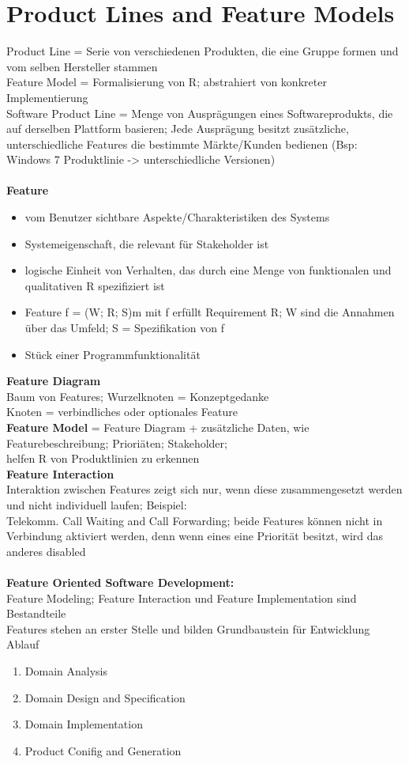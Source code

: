 \section{Product Lines and Feature Models}
Product Line = Serie von verschiedenen Produkten, die eine Gruppe formen und vom selben Hersteller stammen\\
Feature Model = Formalisierung von R; abstrahiert von konkreter Implementierung\\
Software Product Line = Menge von Ausprägungen eines Softwareprodukts, die auf derselben Plattform basieren; Jede Ausprägung besitzt zusätzliche, unterschiedliche Features die bestimmte Märkte/Kunden bedienen (Bsp: Windows 7 Produktlinie -> unterschiedliche Versionen)\\
\\
\textbf{Feature}\\
\begin{itemize}
	\item vom Benutzer sichtbare Aspekte/Charakteristiken des Systems
	\item Systemeigenschaft, die relevant für Stakeholder ist
	\item logische Einheit von Verhalten, das durch eine Menge von funktionalen und qualitativen R spezifiziert ist
	\item Feature f = (W; R; S)m mit f erfüllt Requirement R; W sind die Annahmen über das Umfeld; S = Spezifikation von f
	\item Stück einer Programmfunktionalität
\end{itemize}

\textbf{Feature Diagram}\\
Baum von Features; Wurzelknoten = Konzeptgedanke\\
Knoten = verbindliches oder optionales Feature\\
\textbf{Feature Model} = Feature Diagram + zusätzliche Daten, wie Featurebeschreibung; Prioriäten; Stakeholder;\\
helfen R von Produktlinien zu erkennen
\\
\textbf{Feature Interaction}\\
Interaktion zwischen Features zeigt sich nur, wenn diese zusammengesetzt werden und nicht individuell laufen; Beispiel:\\
Telekomm. Call Waiting and Call Forwarding; beide Features können nicht in Verbindung aktiviert werden, denn wenn eines eine Priorität besitzt, wird das anderes disabled\\
\\
\textbf{Feature Oriented Software Development:}\\
Feature Modeling; Feature Interaction und Feature Implementation sind Bestandteile\\
Features stehen an erster Stelle und bilden Grundbaustein für Entwicklung\\
Ablauf
\begin{enumerate}
	\item Domain Analysis
	\item Domain Design and Specification
	\item Domain Implementation
	\item Product Conifig and Generation
\end{enumerate}